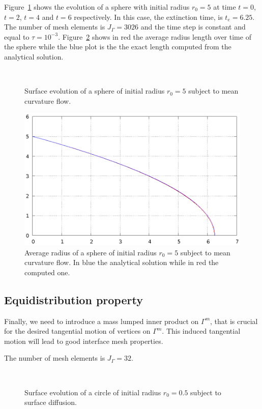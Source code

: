Figure~\ref{fig:mcf_sphere} shows the evolution of a sphere with initial radius
$r_0=5$ at time $t=0$, $t=2$, $t=4$ and $t=6$ respectively. In this case, the
extinction time, is $t_e=6.25$. The number of mesh elements is $J_\Gamma=3026$
and the time step is constant and equal to $\tau=10^{-3}$.
Figure~\ref{fig:mcf_sphere_radius} shows in red the average radius length
over time of the sphere while the blue plot is the the exact length computed
from the analytical solution.

\begin{figure}[htbp]
\centering
{}
\quad
{}
\\
\quad
{}
\caption{Surface evolution of a sphere of initial radius $r_0=5$ subject to
mean curvature flow.}
\label{fig:mcf_sphere}
\end{figure}

\begin{figure}[htbp]
\centering
\includegraphics[width=.45\textwidth]
{figures/geometric_pdes/mcf_sphere_radius.ps}
\caption{Average radius of a sphere of initial radius $r_0=5$ subject to
mean curvature flow. In blue the analytical solution while in red the computed
one.}
\label{fig:mcf_sphere_radius}
\end{figure}

\subsection[Equidistribution property]{Equidistribution property}
Finally, we need to introduce a mass lumped inner product on $\Gamma^m$, that
is crucial for the desired tangential motion of vertices on $\Gamma^m$. This
induced tangential motion will lead to good interface mesh properties.

The number of mesh elements is $J_\Gamma=32$.

\begin{figure}[htbp]
\centering
{}
\quad
{}
\\
\quad
{}
\caption{Surface evolution of a circle of initial radius $r_0=0.5$ subject to
surface diffusion.}
\label{fig:sd_circle}
\end{figure}

